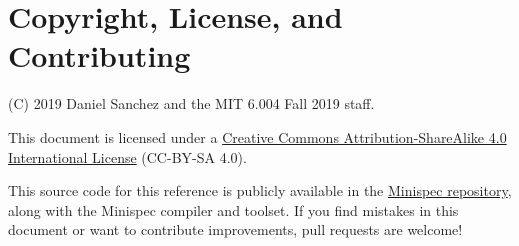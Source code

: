 \section{Copyright, License, and Contributing}

(C) 2019 Daniel Sanchez and the MIT 6.004 Fall 2019 staff.

This document is licensed under a \href{http://creativecommons.org/licenses/by-sa/4.0/}{Creative Commons Attribution-ShareAlike 4.0 International License} (CC-BY-SA 4.0).

This source code for this reference is publicly available in the \href{https://github.mit.edu/6004/minispec/}{Minispec repository},
along with the Minispec compiler and toolset.
If you find mistakes in this document or want to contribute improvements, pull requests are welcome!
